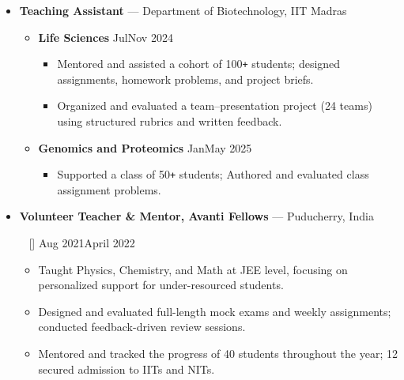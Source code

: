 \vspace{3mm}
\begin{itemize}
  \setlength\itemsep{0.3em}

  \item \textbf{Teaching Assistant} — Department of Biotechnology, IIT Madras

\begin{itemize}\setlength\itemsep{0.2em}
  \item \textbf{Life Sciences} \hfill Jul\textendash Nov 2024
    \begin{itemize}
     \setlength\itemsep{0.2em}
      \item[\textbullet] Mentored and assisted a cohort of 100\texttt{+} students; designed assignments, homework problems, and project briefs.
      \item[\textbullet] Organized and evaluated a team–presentation project (24 teams) using structured rubrics and written feedback.
    \end{itemize}

  \item \textbf{Genomics and Proteomics} \hfill Jan\textendash May 2025
    \begin{itemize}\setlength\itemsep{0.2em}
      \item[\textbullet] Supported a class of 50\texttt{+} students; Authored and evaluated class assignment problems.
    \end{itemize}
\end{itemize}

  \item \textbf{Volunteer Teacher \& Mentor,  Avanti Fellows} — Puducherry, India {\normalfont  ~ [\href{https://avantifellows.org}{\small{\websiteSymbol}}] \hfill Aug 2021\textendash April 2022
   \begin{itemize}\setlength\itemsep{0.2em}

  \item Taught Physics, Chemistry, and Math at JEE level, focusing on personalized support for under-resourced students.

  \item Designed and evaluated full-length mock exams and weekly assignments; conducted feedback-driven review sessions.
  
  \item Mentored and tracked the progress of 40 students throughout the year; 12 secured admission to IITs and NITs.
\end{itemize}


}
\end{itemize}
